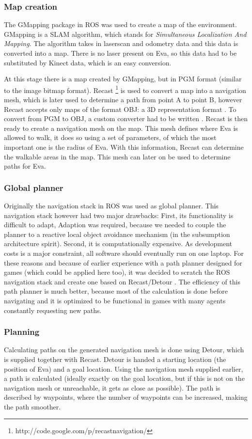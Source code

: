\documentclass[project_eva.tex]{subfiles}
\begin{document}
\subsubsection*{Map creation}
The GMapping package in ROS was used to create a map of the environment. GMapping \cite{GMapping} is a SLAM algorithm, 
which stands for \textit{Simultaneous Localization And Mapping}. The algorithm takes in laserscan and odometry data and 
this data is converted into a map. There is no laser present on Eva, so this data had to be substituted by Kinect data, 
which is an easy conversion.

At this stage there is a map created by GMapping, but in PGM format (similar to the image bitmap format). Recast 
\footnote{http://code.google.com/p/recastnavigation/} is used to convert a map into a navigation mesh, which is later used to determine a path from point A to point B, however Recast accepts only maps of the format OBJ: a 3D representation 
format \cite{wavefront}. To convert from PGM to OBJ, a custom converter had to be written \cite{Tech} . Recast is then ready to create a navigation mesh on the map. This mesh defines where Eva is allowed to walk, it does so using a set of parameters, of which the most important one is the radius of Eva. With this information, Recast can determine the walkable areas in the map. This mesh can later on be used to determine paths for Eva.

\subsubsection*{Global planner}
Originally the navigation stack in ROS was used as global planner. This navigation stack however had two major drawbacks: First, its functionality is difficult to adapt, Adaption was required, because we needed to couple the planner to a reactive local object avoidance mechanism (in the subsumption architecture spirit). Second, it is computationally expensive. As development costs is a major constraint, all software should eventually run on one laptop. For these reasons and because of earlier experience with a path planner designed for games (which could be applied here too), it was decided to scratch the ROS navigation stack and create one based on Recast/Detour \label{Global}. The efficiency of this path planner is much better, because most of the calculation is done before navigating and it is optimized to be functional in games with many agents constantly requesting new paths.

\subsubsection*{Planning}
Calculating paths on the generated navigation mesh is done using Detour, which is supplied together with Recast. Detour is handed a starting location (the position of Eva) and a goal location. Using the navigation mesh supplied earlier, a path is calculated (ideally exactly on the goal location, but if this is not on the navigation mesh or unreachable, it gets as close as possible). The path is described by waypoints, where the number of waypoints can be increased, making the path smoother.
\end{document}
